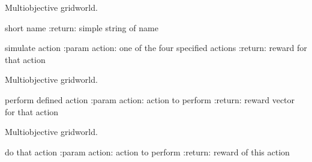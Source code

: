 \documentclass[letterpaper,10pt,english]{sphinxmanual}
\begin{document}
\begin{fulllineitems}
\label{Problems:morl_problems.MORLGridworld}
Multiobjective gridworld.

\begin{fulllineitems}
\label{Problems:morl_problems.MORLGridworld.name}
short name
:return: simple string of name

\end{fulllineitems}


\begin{fulllineitems}
\label{Problems:morl_problems.MORLGridworld.play}
simulate action
:param action: one of the four specified actions
:return: reward for that action

\end{fulllineitems}


\end{fulllineitems}


\begin{fulllineitems}
\label{Problems:morl_problems.MORLGridworldStatic}
Multiobjective gridworld.

\begin{fulllineitems}
\label{Problems:morl_problems.MORLGridworldStatic.play}
perform defined action
:param action: action to perform
:return: reward vector for that action

\end{fulllineitems}


\end{fulllineitems}


\begin{fulllineitems}
\label{Problems:morl_problems.MORLGridworldTime}
Multiobjective gridworld.

\begin{fulllineitems}
\label{Problems:morl_problems.MORLGridworldTime.play}
do that action
:param action: action to perform
:return: reward of this action

\end{fulllineitems}


\end{fulllineitems}
\end{document}
